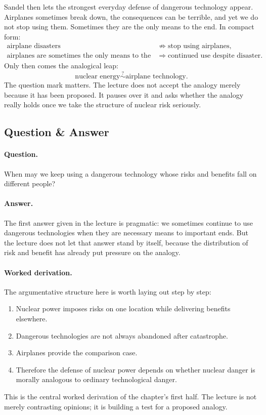 Sandel then lets the strongest everyday defense of dangerous technology appear. Airplanes sometimes break down, the consequences can be terrible, and yet we do not stop using them. Sometimes they are the only means to the end. In compact form:
\begin{align}
\text{airplane disasters}
&\not\Rightarrow
\text{stop using airplanes},\\
\text{airplanes are sometimes the only means to the end}
&\Longrightarrow
\text{continued use despite disaster}.
\end{align}
Only then comes the analogical leap:
\begin{equation}
\text{nuclear energy}
\stackrel{?}{\sim}
\text{airplane technology}.
\end{equation}
The question mark matters. The lecture does not accept the analogy merely because it has been proposed. It pauses over it and asks whether the analogy really holds once we take the structure of nuclear risk seriously.

\subsection{Question \& Answer}

\paragraph{Question.} When may we keep using a dangerous technology whose risks and benefits fall on different people?

\paragraph{Answer.} The first answer given in the lecture is pragmatic: we sometimes continue to use dangerous technologies when they are necessary means to important ends. But the lecture does not let that answer stand by itself, because the distribution of risk and benefit has already put pressure on the analogy.

\paragraph{Worked derivation.} The argumentative structure here is worth laying out step by step:
\begin{enumerate}
\item Nuclear power imposes risks on one location while delivering benefits elsewhere.
\item Dangerous technologies are not always abandoned after catastrophe.
\item Airplanes provide the comparison case.
\item Therefore the defense of nuclear power depends on whether nuclear danger is morally analogous to ordinary technological danger.
\end{enumerate}
This is the central worked derivation of the chapter's first half. The lecture is not merely contrasting opinions; it is building a test for a proposed analogy.

